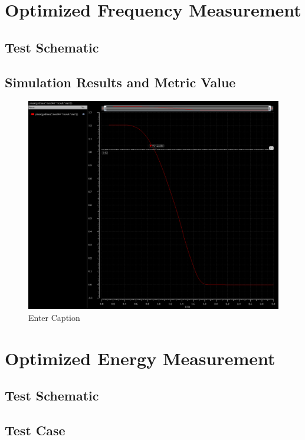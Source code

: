 \documentclass[12pt]{article}
\begin{document}
\newpage

\section{Optimized Frequency Measurement}
\subsection{Test Schematic}



\newpage

\subsection{Simulation Results and Metric Value}

\begin{figure}
    \centering
    \includegraphics[width=0.5\linewidth]{writeup//figures/max_frequencies_optimized.png}
    \caption{Enter Caption}
\end{figure}



\newpage

\section{Optimized Energy Measurement}
\subsection{Test Schematic}



\newpage

\subsection{Test Case}
\end{document}
